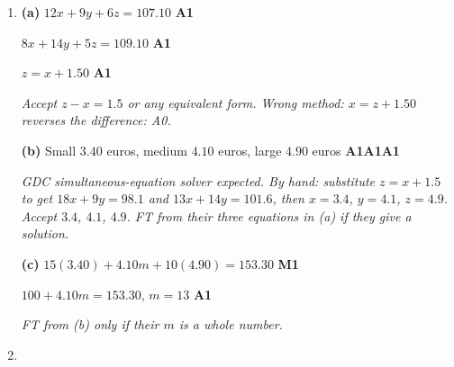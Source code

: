 \documentclass[12pt, twoside]{article}
\begin{document}
\begin{enumerate}[itemsep=0.3cm]
\emph{Common error: $0.76$ (``at least one'' in place of ``exactly
one''): M0A0.}

(iii) $1 - 0.58 = 0.42$ \hfill \textbf{A1}

\emph{Accept percentages ($18\%$, $59\%$, $42\%$) or fractions. FT from
(a).}

\textbf{(c)} $0.17 \times 1200$ \hfill \textbf{M1}

$= 204$ \hfill \textbf{A1}

\emph{FT from (a).}

\textbf{(d)} Dog only: $46 - 15 = 31\%$ \hfill \textbf{M1}

Cat only: $100 - 31 - 15 - 32 = 22\%$ \hfill \textbf{M1}

$P(\text{cat}) = 0.22 + 0.15 = 0.37$ \hfill \textbf{A1}

\emph{Accept $n(D \cup C) = 68$, so $68 = 46 + c - 15$, $c = 37\%$
(M1M1A1). Wrong methods: $0.22$ is cat \emph{only} (M1M1A0);
$1 - 0.46 = 0.54$ is ``no dog'' (M0M0A0).}

\newpage

\item[3.] [Maximum mark: 8]

\textbf{(a)} $12x + 9y + 6z = 107.10$ \hfill \textbf{A1}

$8x + 14y + 5z = 109.10$ \hfill \textbf{A1}

$z = x + 1.50$ \hfill \textbf{A1}

\emph{Accept $z - x = 1.5$ or any equivalent form. Wrong method:
$x = z + 1.50$ reverses the difference: A0.}

\textbf{(b)} Small $3.40$ euros, medium $4.10$ euros, large $4.90$ euros
\hfill \textbf{A1A1A1}

\emph{GDC simultaneous-equation solver expected. By hand: substitute
$z = x + 1.5$ to get $18x + 9y = 98.1$ and $13x + 14y = 101.6$, then
$x = 3.4$, $y = 4.1$, $z = 4.9$. Accept $3.4$, $4.1$, $4.9$. FT from their
three equations in (a) if they give a solution.}

\textbf{(c)} $15(3.40) + 4.10m + 10(4.90) = 153.30$ \hfill \textbf{M1}

$100 + 4.10m = 153.30$, \quad $m = 13$ \hfill \textbf{A1}

\emph{FT from (b) only if their $m$ is a whole number.}

\newpage

\item[4.] [Maximum mark: 14]


\end{enumerate}
\end{document}

